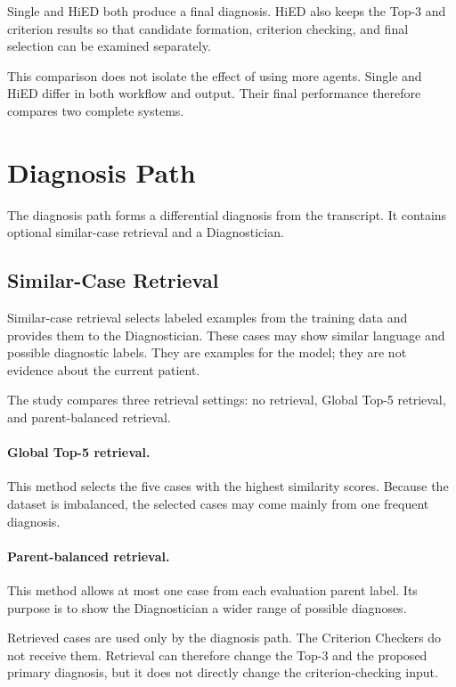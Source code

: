 \documentclass[12pt,a4paper,oneside]{report}
\begin{document}
Single and HiED both produce a final diagnosis. HiED also keeps the
Top-3 and criterion results so that candidate formation, criterion
checking, and final selection can be examined separately.

This comparison does not isolate the effect of using more agents. Single
and HiED differ in both workflow and output. Their final performance
therefore compares two complete systems.

\section{Diagnosis Path}
\label{sec:retrieval}
\label{sec:diagnosis-path}

The diagnosis path forms a differential diagnosis from the transcript.
It contains optional similar-case retrieval and a Diagnostician.

\subsection{Similar-Case Retrieval}

Similar-case retrieval selects labeled examples from the training data
and provides them to the Diagnostician. These cases may show similar
language and possible diagnostic labels. They are examples for the
model; they are not evidence about the current patient.

The study compares three retrieval settings: no retrieval, Global Top-5
retrieval, and parent-balanced retrieval.

\paragraph{Global Top-5 retrieval.}

This method selects the five cases with the highest similarity scores.
Because the dataset is imbalanced, the selected cases may come mainly
from one frequent diagnosis.

\paragraph{Parent-balanced retrieval.}

This method allows at most one case from each evaluation parent label.
Its purpose is to show the Diagnostician a wider range of possible
diagnoses.

Retrieved cases are used only by the diagnosis path. The Criterion
Checkers do not receive them. Retrieval can therefore change the Top-3
and the proposed primary diagnosis, but it does not directly change the
criterion-checking input.
\end{document}
